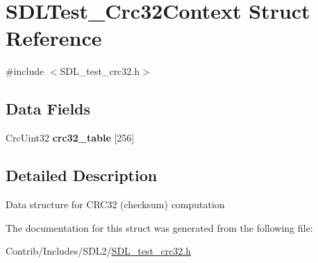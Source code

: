 \hypertarget{struct_s_d_l_test___crc32_context}{}\section{S\+D\+L\+Test\+\_\+\+Crc32\+Context Struct Reference}
\label{struct_s_d_l_test___crc32_context}


{\ttfamily \#include $<$S\+D\+L\+\_\+test\+\_\+crc32.\+h$>$}

\subsection*{Data Fields}
\begin{DoxyCompactItemize}
\item 
Crc\+Uint32 {\bfseries crc32\+\_\+table} \mbox{[}256\mbox{]}\hypertarget{struct_s_d_l_test___crc32_context_a4694d1d41574492c790b55f3673f220a}{}\label{struct_s_d_l_test___crc32_context_a4694d1d41574492c790b55f3673f220a}

\end{DoxyCompactItemize}


\subsection{Detailed Description}
Data structure for C\+R\+C32 (checksum) computation 

The documentation for this struct was generated from the following file\+:\begin{DoxyCompactItemize}
\item 
Contrib/\+Includes/\+S\+D\+L2/\hyperlink{_s_d_l__test__crc32_8h}{S\+D\+L\+\_\+test\+\_\+crc32.\+h}\end{DoxyCompactItemize}
